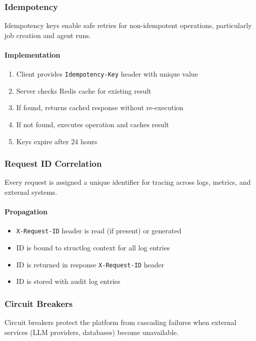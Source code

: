 \subsubsection{Idempotency}

Idempotency keys enable safe retries for non-idempotent operations, particularly job creation and agent runs.

\paragraph{Implementation}
\begin{enumerate}
    \item Client provides \texttt{Idempotency-Key} header with unique value
    \item Server checks Redis cache for existing result
    \item If found, returns cached response without re-execution
    \item If not found, executes operation and caches result
    \item Keys expire after 24 hours
\end{enumerate}

\subsubsection{Request ID Correlation}

Every request is assigned a unique identifier for tracing across logs, metrics, and external systems.

\paragraph{Propagation}
\begin{itemize}
    \item \texttt{X-Request-ID} header is read (if present) or generated
    \item ID is bound to structlog context for all log entries
    \item ID is returned in response \texttt{X-Request-ID} header
    \item ID is stored with audit log entries
\end{itemize}

\subsubsection{Circuit Breakers}

Circuit breakers protect the platform from cascading failures when external services (LLM providers, databases) become unavailable.

